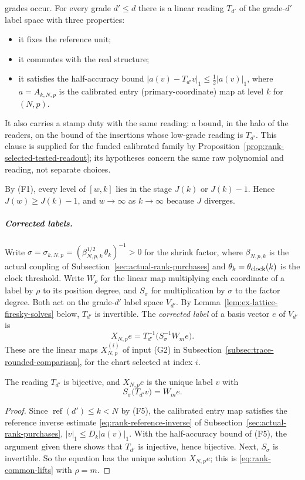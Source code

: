 \begin{enumerate}
 grades occur. For every grade $d'\le d$ there is a linear reading $T_{d'}$
 of the grade-$d'$ label space with three properties:
 \begin{itemize}
 \item it fixes the reference unit;
 \item it commutes with the real structure;
 \item it satisfies the half-accuracy bound
  $|a(v)-T_{d'}v|_1\le\frac12|a(v)|_1$, where $a=A_{k,N,p}$ is the
  calibrated entry (primary-coordinate) map at level $k$ for $(N,p)$.
 \end{itemize}
 It also carries a stamp duty with the same reading: a bound, in the
 halo of the readers, on the bound of the insertions whose low-grade
 reading is $T_{d'}$. This clause is supplied for the funded calibrated family by
 Proposition~\ref{prop:rank-selected-tested-readout}; its hypotheses
 concern the same raw polynomial and reading, not separate choices.
\end{enumerate}
By (F1), every level of $[w,k]$ lies in the stage $J(k)$ or $J(k)-1$. Hence
$J(w)\ge J(k)-1$, and $w\to\infty$ as $k\to\infty$ because $J$ diverges.

\subparagraph{Corrected labels.}
Write $\sigma=\sigma_{k,N,p}=(\beta_{N,p,k}^{1/2}\,\theta_k)^{-1}>0$ for
the shrink factor, where $\beta_{N,p,k}$ is the actual coupling of
Subsection~\ref{sec:actual-rank-purchases} and $\theta_k=\theta_{\rm clock}(k)$
is the clock threshold. Write $W_\rho$ for the linear map multiplying each
coordinate of a label by $\rho$ to its position degree, and $S_\sigma$ for
multiplication by $\sigma$ to the factor degree. Both act on the
grade-$d'$ label space $V_{d'}$. By Lemma~\ref{lem:ex-lattice-firesky-solves}
below, $T_{d'}$ is invertible. The \emph{corrected label} of a basis
vector $e$ of $V_{d'}$ is
\[
 X_{N,p}e=T_{d'}^{-1}\bigl(S_{\sigma}^{-1}W_me\bigr).
\]
These are the linear maps $X^{(i)}_{N,p}$ of input (G2) in
Subsection~\ref{subsec:trace-rounded-comparison}, for the chart selected at index
$i$.

\begin{lemma}
\label{lem:ex-lattice-firesky-solves}
The reading $T_{d'}$ is bijective, and $X_{N,p}e$ is the unique label $v$
with
\begin{equation}\label{eq:ex-lattice-firesky-solves}
 S_\sigma\bigl(T_{d'}v\bigr)=W_me .
\end{equation}
\end{lemma}
\begin{proof}
Since $\operatorname{ref}(d')\le k<N$ by (F5), the calibrated entry map
satisfies the reference inverse estimate
\eqref{eq:rank-reference-inverse} of
Subsection~\ref{sec:actual-rank-purchases}, $|v|_1\le D_k|a(v)|_1$. With the
half-accuracy bound of (F5), the argument given there shows that $T_{d'}$
is injective, hence bijective. Next, $S_\sigma$ is invertible. So the
equation has the unique solution $X_{N,p}e$; this is
\eqref{eq:rank-common-lifts} with $\rho=m$.
\end{proof}

